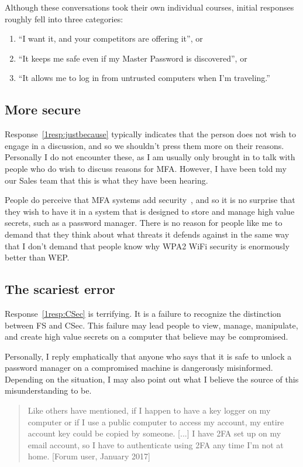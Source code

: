 \documentclass{soups}
\begin{document}
Although these conversations took their own individual courses,
initial responses roughly fell into three categories:
\begin{enumerate}
  \item “I want it, and your competitors are offering it”, or \label{1resp:justbecause}
  \item “It keeps me safe even if my Master Password is discovered”, or \label{1resp:FS}
  \item “It allows me to log in from untrusted computers when I'm traveling.”\label{1resp:CSec}
\end{enumerate}

\subsection{More secure}
Response~\ref{1resp:justbecause} typically indicates that the person does not wish to engage in a discussion, and so we shouldn't press them more on their reasons.
Personally I do not encounter these, as I am usually only brought in to talk with people who do wish to discuss reasons for MFA.
However, I have been told my our Sales team that this is what they have been hearing.

People do perceive that MFA systems add security~\autocites{gunsonETAL2011:CS,CristofaroDFN13},
and so it is no surprise that they wish to have it in a system that is designed to store and manage high value secrets, such as a password manager.
There is no reason for people like me to demand that they think about what threats it defends against in the same way that I don't demand that people know why WPA2 WiFi security is enormously better than WEP.

\subsection{The scariest error}

Response~\ref{1resp:CSec} is terrifying.
It is a failure to recognize the distinction between FS and CSec.
This failure may lead people to view, manage, manipulate, and create high value
secrets on a computer that believe may be compromised.

Personally, I reply emphatically that anyone who says that it is safe to unlock a password manager on a compromised machine is dangerously misinformed. Depending on the situation, I may also point out what I believe the source of this misunderstanding to be.

\begin{quotation}
  Like others have mentioned, if I happen to have a key logger on my computer or if I use a public computer to access my account, my entire account key could be copied by someone. [...] I have 2FA set up on my email account, so I have to authenticate using 2FA any time I'm not at home.
  [Forum user, January 2017]
\end{quotation}
\end{document}
